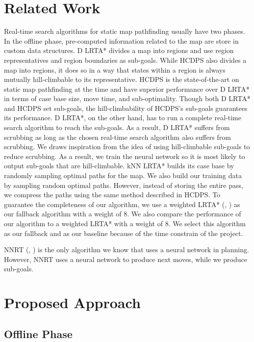 \documentclass[letterpaper]{article}
\newcommand{\citea}[1]{(\citeauthor{#1}, \citeyear{#1})}
\numberwithin{equation}{section}
\numberwithin{theorem}{section}
\numberwithin{lemma}{section}
\numberwithin{df}{section}
\begin{document}
    \section{Related Work}\label{sec:related-work}

    Real-time search algorithms for static map pathfinding usually have two phases.
    In the offline phase, pre-computed information related to the map are store in custom data structures.
    D LRTA* divides a map into regions and use region representatives and region boundaries as sub-goals.
    While HCDPS also divides a map into regions, it does so in a way that states within a region is always mutually hill-climbable to its representative.
    HCDPS is the state-of-the-art on static map pathfinding at the time and have superior performance over D LRTA* in terms of case base size, move time, and sub-optimality.
    Though both D LRTA* and HCDPS set sub-goals, the hill-climbability of HCDPS's sub-goals guarantees its performance.
    D LRTA*, on the other hand, has to run a complete real-time search algorithm to reach the sub-goals.
    As a result, D LRTA* suffers from scrubbing as long as the chosen real-time search algorithm also suffers from scrubbing.
    We draws inspiration from the idea of using hill-climbable sub-goals to reduce scrubbing.
    As a result, we train the neural network so it is most likely to output sub-goals that are hill-climbable.
    kNN LRTA* builds its case base by randomly sampling optimal paths for the map.
    We also build our training data by sampling random optimal paths.
    However, instead of storing the entire pass, we compress the paths using the same method described in HCDPS.
    To guarantee the completeness of our algorithm, we use a weighted LRTA* \citea{wlrta} as our fallback algorithm with a weight of 8.
    We also compare the performance of our algorithm to a weighted LRTA* with a weight of 8.
    We select this algorithm as our fallback and as our baseline because of the time constrain of the project.

    NNRT \citea{nnrt} is the only algorithm we know that uses a neural network in planning.
    However, NNRT uses a neural network to produce next moves, while we produce sub-goals.

    \section{Proposed Approach}\label{sec:proposed-approach}

    \subsection{Offline Phase}
\end{document}
